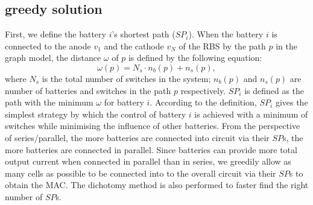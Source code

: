 \documentclass{article}
\begin{document}
\subsection{greedy solution}
First, we define the battery $i$'s shortest path ($SP_i$).
When the battery $i$ is connected to the anode $v_1$ and the cathode $v_N$ of the RBS by the path $p$ in the graph model, the distance $\omega$ of $p$ is defined by the following equation:
\begin{equation}
    \omega(p) = N_s \cdot n_b (p) + n_s (p),
\end{equation}
where $N_s$ is the total number of switches in the system; $n_b(p)$ and $n_s(p)$ are number of batteries and switches in the path $p$ respectively.
$SP_i$ is defined as the path with the minimum $\omega$ for battery $i$.
According to the definition, $SP_i$ gives the simplest strategy by which the control of battery $i$ is achieved with a minimum of switches while minimising the influence of other batteries.
From the perspective of series/parallel, the more batteries are connected into circuit via their $SP$s, the more batteries are connected in parallel.
Since batteries can provide more total output current when connected in parallel than in series, we greedily allow as many cells as possible to be connected into to the overall circuit via their $SP$s to obtain the MAC.
The dichotomy method is also performed to faster find the right number of $SP$s.
\end{document}
